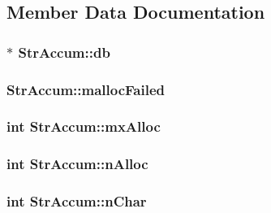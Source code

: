 \subsection{Member Data Documentation}
\hypertarget{struct_str_accum_ade44091c9a91671c9457b9e4a98a9a5d}{
\subsubsection[{db}]{$\ast$ Str\-Accum\-::db}}\label{struct_str_accum_ade44091c9a91671c9457b9e4a98a9a5d}
\hypertarget{struct_str_accum_a6bc89e5ed8495ddcddadf0940f236c84}{
\subsubsection[{malloc\-Failed}]{ Str\-Accum\-::malloc\-Failed}}\label{struct_str_accum_a6bc89e5ed8495ddcddadf0940f236c84}
\hypertarget{struct_str_accum_ab9985e4aabc65bebbf026881ce0b59bd}{
\subsubsection[{mx\-Alloc}]{\setlength{\rightskip}{0pt plus 5cm}int Str\-Accum\-::mx\-Alloc}}\label{struct_str_accum_ab9985e4aabc65bebbf026881ce0b59bd}
\hypertarget{struct_str_accum_ae2f21c484b737b9903e695977c27815a}{
\subsubsection[{n\-Alloc}]{\setlength{\rightskip}{0pt plus 5cm}int Str\-Accum\-::n\-Alloc}}\label{struct_str_accum_ae2f21c484b737b9903e695977c27815a}
\hypertarget{struct_str_accum_a88bf779588ca597a41fde3e41186e003}{
\subsubsection[{n\-Char}]{\setlength{\rightskip}{0pt plus 5cm}int Str\-Accum\-::n\-Char}}\label{struct_str_accum_a88bf779588ca597a41fde3e41186e003}
